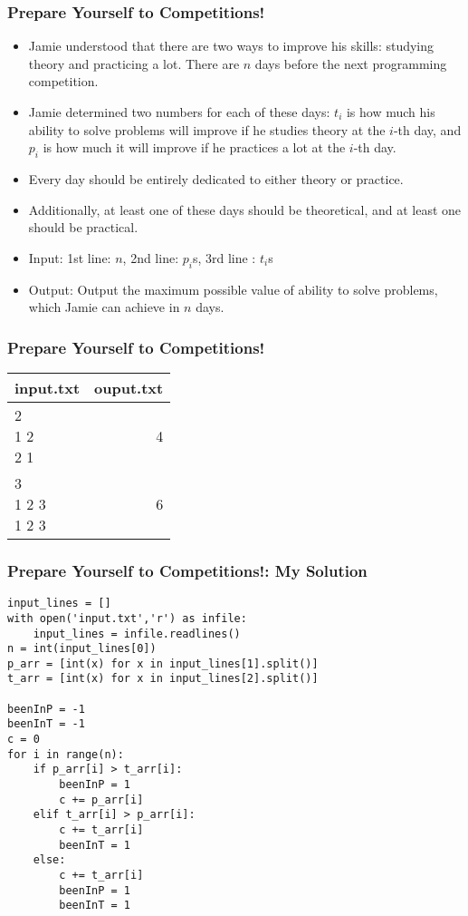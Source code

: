 \begin{frame}[fragile]\frametitle{Prepare Yourself to Competitions!}
\begin{itemize}
\item  Jamie understood that there are two ways to improve his skills: studying theory and practicing a lot. There are $n$ days before the next programming competition. 
\item Jamie determined two numbers for each of these days: $t_i$ is how much his ability to solve problems will improve if he studies theory at the $i$-th day, and $p_i$ is how much it will improve if he practices a lot at the $i$-th day. 
\item Every day should be entirely dedicated to either theory or practice. 
\item Additionally, at least one of these days should be theoretical, and at least one should be practical.
\item Input: 1st line: $n$, 2nd line: $p_i$s, 3rd line : $t_i$s
\item Output: Output the maximum possible value of ability to solve problems, which Jamie can achieve in $n$ days. 
\end{itemize}
\end{frame}

\begin{frame}[fragile]\frametitle{Prepare Yourself to Competitions!}

\begin{table}[h!]
    \begin{tabular}{|l|r|}
	\hline
      input.txt & ouput.txt\\
      \hline
		\makecell[l]{
		2 \\
		1 2 \\ 
		2 1} & 4\\ \hline
		\makecell[l]{
		3\\
		1 2 3\\
		1 2 3} & 6\\		
	  \hline
    \end{tabular}
\end{table}
\end{frame}


\begin{frame}[fragile]\frametitle{Prepare Yourself to Competitions!: My Solution}
\begin{lstlisting}
input_lines = []
with open('input.txt','r') as infile:
	input_lines = infile.readlines()
n = int(input_lines[0])
p_arr = [int(x) for x in input_lines[1].split()]
t_arr = [int(x) for x in input_lines[2].split()]

beenInP = -1
beenInT = -1
c = 0
for i in range(n):
	if p_arr[i] > t_arr[i]:
		beenInP = 1
		c += p_arr[i]
	elif t_arr[i] > p_arr[i]:
		c += t_arr[i]
		beenInT = 1
	else:
		c += t_arr[i]
		beenInP = 1
		beenInT = 1	
\end{lstlisting}
\end{frame}

